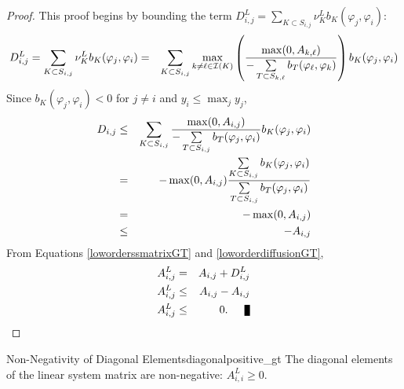\begin{proof}
This proof begins by bounding the term
$D_{i,j}^L=\sum\limits_{K\subset S_{i,j}}\nu_K^L b_K(\varphi_j, \varphi_i)$:
\begin{eqnarray*}
   D_{i,j}^L=\sum\limits_{K\subset S_{i,j}}\nu_K^L b_K(\varphi_j, \varphi_i)
   & = & \sum\limits_{K\subset S_{i,j}}\max\limits_{k\ne \ell\in \mathcal{I}(K)}
      \left(\frac{\max(0,A_{k,\ell})}
		{-\sum\limits_{T\subset S_{k,\ell}} b_T(\varphi_{\ell}, \varphi_k)}\right)
      b_K(\varphi_j,\varphi_i)
\end{eqnarray*}
Since $b_K(\varphi_j, \varphi_i) < 0$ for $j\ne i$ and $y_i \leq \max_j y_j$,
\begin{eqnarray*}
   D_{i,j} & \le & \sum\limits_{K\subset S_{i,j}} \frac{\max(0,A_{i,j})}
		{-\sum\limits_{T\subset S_{i,j}} b_T(\varphi_j, \varphi_i)}b_K(\varphi_j,\varphi_i)\\
   & =   & -\max(0,A_{i,j}) \frac{\sum\limits_{K\subset S_{i,j}}
      b_K(\varphi_j,\varphi_i)}
		{\sum\limits_{T\subset S_{i,j}} b_T(\varphi_j, \varphi_i)}\\   
   & = & -\max(0,A_{i,j})\\
   & \le & -A_{i,j}
\end{eqnarray*}
From Equations \eqref{loworderssmatrixGT} and \eqref{loworderdiffusionGT},
\begin{eqnarray*}
	A^L_{i,j} & = & A_{i,j} + D_{i,j}^L\\
   A^L_{i,j} & \le & A_{i,j} - A_{i,j}\\
   A^L_{i,j} & \le & 0.\qed
\end{eqnarray*}
\end{proof}
\begin{lemma}{Non-Negativity of Diagonal Elements}{diagonalpositive_gt}
   The diagonal elements  of the linear system matrix are non-negative: $A^L_{i,i}\ge 0$.
\end{lemma}

